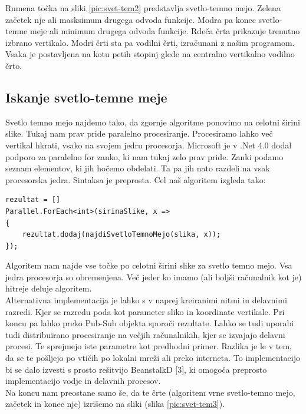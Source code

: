 \documentclass[oneside, a4paper, 12pt]{book}
\begin{document}
Rumena točka na sliki \ref{pic:svet-tem2} predstavlja svetlo-temno mejo. Zelena začetek nje ali masksimum drugega odvoda funkcije. Modra pa konec svetlo-temne meje ali minimum drugega odvoda funkcije. Rdeča črta prikazuje trenutno izbrano vertikalo. Modri črti sta pa vodilni črti, izračunani z našim programom. Vsaka je postavljena na kotu petih stopinj glede na centralno vertikalno vodilno črto. 


\subsection{Iskanje svetlo-temne meje}
\label{ch:iskanj-sv-t-m}
Svetlo temno mejo najdemo tako, da zgornje algoritme ponovimo na celotni širini slike. Tukaj nam prav pride paralelno procesiranje. Procesiramo lahko več vertikal hkrati, vsako na svojem jedru procesorja. Microsoft je v .Net 4.0 dodal podporo za paralelno for zanko, ki nam tukaj zelo prav pride. Zanki podamo seznam elementov, ki jih hočemo obdelati. Ta pa jih nato razdeli na vsak procesorska jedra. Sintaksa je preprosta. Cel naš algoritem izgleda tako:

\begin{verbatim}
rezultat = []
Parallel.ForEach<int>(sirinaSlike, x =>
{
    rezultat.dodaj(najdiSvetloTemnoMejo(slika, x));
});
\end{verbatim}


Algoritem nam najde vse točke po celotni širini slike za svetlo temno mejo. Vsa jedra procesorja so obremenjena. Več jeder ko imamo (ali boljši računalnik kot je) hitreje deluje algoritem. \\
Alternativna implementacija je lahko s v naprej kreiranimi nitmi in delavnimi razredi. Kjer se razredu poda kot parameter sliko in koordinate vertikale. Pri koncu pa lahko preko Pub-Sub objekta sporoči rezultate. Lahko se tudi uporabi tudi distribuirano procesiranje na večjih računalnikih, kjer se izvajajo delavni procesi. Te sprejmejo iste parametre kot predhodni primer. Razlika je le v tem, da se te pošljejo po vtičih po lokalni mreži ali preko interneta. To implementacijo bi se dalo izvesti s prosto rešitvijo BeanstalkD [3], ki omogoča preprosto implementacijo vodje in delavnih procesov.\\
Na koncu nam preostane samo še, da te črte (algoritem vrne svetlo-temno mejo, začetek in konec nje) izrišemo na sliki (slika \ref{pic:svet-tem3}). 
\end{document}
